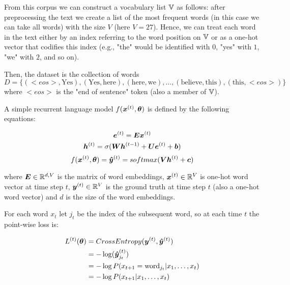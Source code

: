 From this corpus we can construct a vocabulary list $\mathbb{V}$ as follows: after preprocessing the text we create a list of the most frequent words (in this case we can take all words) with the size $V$ (here $V=27$). Hence, we can treat each word in the text either by an index referring to the word position on $\mathbb{V}$ or as a one-hot vector that codifies this index (e.g., "the" would be identified with $0$, "yes" with $1$, "we" with $2$, and so on).

Then, the dataset is the collection of words 
\[
D = \{(<eos>, \text{Yes}), (\text{Yes}, \text{here}), (\text{here}, \text{we}),\dots,(\text{believe}, \text{this}), (\text{this}, <eos>)\}
\]
where $<eos>$ is the "end of sentence" token (also a member of $\mathbb{V}$).

A simple recurrent language model $f(\bm{x}^{(t)}, \bm{\theta})$ is defined by the following equations:

\begin{equation}
\bm{e}^{(t)} = \bm{E}\bm{x}^{(t)}
\end{equation}
\vspace{0.2cm}
\begin{equation}
\bm{h}^{(t)} = \sigma(\bm{W}\bm{h}^{(t-1)}+ \bm{U}\bm{e}^{(t)}+ \bm{b})
\end{equation}
\vspace{0.2cm}
\begin{equation}
f(\bm{x}^{(t)}, \bm{\theta}) = \bm{\hat{y}}^{(t)} = softmax(\bm{V}\bm{h}^{(t)} + \bm{c})
\end{equation}

where $\bm{E} \in \mathbb{R}^{d,V}$ is the matrix of word embeddings, $\bm{x}^{(t)} \in \mathbb{R}^{V}$ is one-hot word vector at time step $t$, $\bm{y}^{(t)} \in \mathbb{R}^{V}$ is the ground truth at time step $t$ (also a one-hot word vector) and $d$ is the size of the word embeddings.

For each word $x_t$ let $j_t$ be the index of the subsequent word, so at each time $t$ the point-wise loss is:

\begin{align}
\label{lossCE}
L^{(t)}(\bm{\theta}) &= CrossEntropy(\bm{y}^{(t)},\bm{\hat{y}}^{(t)})\\
    &= - \log({\bm{\hat{y}}^{(t)}}_{j_t})\\
        &= - \log P(x_{t+1} = \text{word}_{j_t}|x_{1}, \dots, x_{t})\\
        &= - \log P(x_{t+1}|x_{1}, \dots, x_{t})
\end{align}

